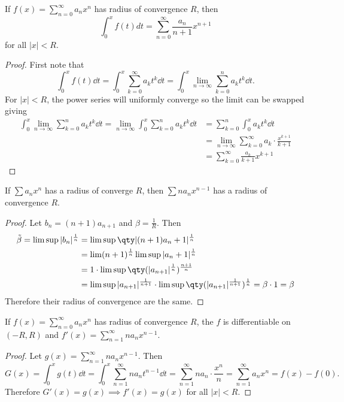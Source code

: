 \documentclass[../notes.tex]{subfiles}
\begin{document}
\begin{theorem}
    If $f(x) = \displaystyle \sum_{n=0}^\infty a_n x^n$ has radius of convergence $R$, then
    \[
        \int_0^x f(t) dt = \sum_{n=0}^\infty \frac{a_n}{n+1} x^{n+1}
    \]
    for all $|x| < R$.
\end{theorem}

\begin{proof}
    First note that
    \[
        \int_0^x f(t) \dd t = \int_0^x \sum_{k=0}^\infty a_k t^k \dd t = \int_0^x \lim_{n \to \infty} \sum_{k=0}^n a_k t^k \dd t
    .\]
    For $|x| < R$, the power series will uniformly converge so the limit can be swapped giving
    \begin{align*}
        \int_0^x \lim_{n \to \infty} \sum_{k=0}^n a_k t^k \dd t = 
        \lim_{n\to \infty} \int_0^x \sum_{k=0}^n a_k t^k \dd t &= 
        \sum_{k=0}^n \int_0^x a_k t^k \dd t \\
       &= \lim_{n\to \infty} \sum_{k=0}^\infty a_k \cdot \frac{x^{k+1}}{k+1} \\
       &= \sum_{k=0}^\infty \frac{a_k}{k+1} x^{k+1}
    \end{align*}
\end{proof}

\begin{lemma}
    If $\sum a_n x^n$ has a radius of converge $R$, then $\sum na_n x^{n-1}$ has a radius of convergence $R$.
\end{lemma}
\begin{proof}
    Let $b_n = (n+1) a_{n+1}$ and $\beta = \frac{1}{R}$. Then
    \begin{align*}
        \tilde{\beta} = \limsup |b_n|^\frac{1}{n} &= 
        \limsup \qty|(n+1)a_n+1|^\frac{1}{n}  \\
        &= \lim (n+1)^\frac{1}{n} \limsup |a_n+1|^\frac{1}{n} \\
        &= 1 \cdot \limsup \qty(|a_{n+1}|^\frac{1}{n})^\frac{n+1}{n} \\
        &= \limsup |a_{n+1}|^\frac{1}{n+1} \cdot \limsup \qty(|a_{n+1}|^\frac{1}{n+1})^\frac{1}{n} = \beta \cdot 1 = \beta
    \end{align*}
    Therefore their radius of convergence are the same.
\end{proof}

\begin{theorem}
    If $f(x) = \displaystyle \sum_{n=0}^\infty a_n x^n$ has radius of convergence $R$, the $f$ is differentiable on $(-R, R)$ and $f'(x) = \displaystyle \sum_{n=1}^\infty n a_n x^{n-1}$.
\end{theorem}

\begin{proof}
    Let $g(x) = \sum_{n=1}^\infty n a_n x^{n-1}$. Then
    \[
        G(x) = \int_0^x g(t) \dd t = \int_0^x \sum_{n=1}^\infty n a_n t^{n-1} \dd t = \sum_{n=1}^\infty n a_n \cdot \frac{x^n}{n} = \sum_{n=1}^\infty a_n x^n = f(x) - f(0)
    .\]
    Therefore $G'(x) = g(x) \implies f'(x) = g(x)$ for all $|x| < R$.
\end{proof}
\end{document}
